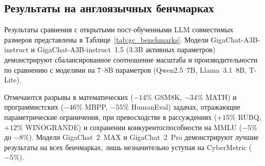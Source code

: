 \subsection{Результаты на англоязычных бенчмарках}\label{subsec:gc_english}

Результаты сравнения с открытыми пост-обученными LLM совместимых размеров представлены в Таблице~\ref{tab:gc_benchmarks}. Модели GigaChat-A3B-instruct и GigaChat-A3B-instruct~1.5 (3.3B активных параметров) демонстрируют сбалансированное соотношение масштаба и производительности по сравнению с моделями на 7--8B параметров (Qwen2.5~7B, Llama~3.1~8B, T-Lite).

Отмечаются разрывы в математических ($-14\%$ GSM8K, $-34\%$ MATH) и программистских ($-46\%$ MBPP, $-55\%$ HumanEval) задачах, отражающие параметрические ограничения, при превосходстве в рассуждениях ($+15\%$ RUBQ, $+12\%$ WINOGRANDE) и сохранении конкурентоспособности на MMLU ($-5\%$ до $-8\%$). Модели GigaChat~2~MAX и GigaChat~2~Pro демонстрируют лучшие результаты на всех бенчмарках, лишь незначительно уступая на CyberMetric ($-5\%$).


